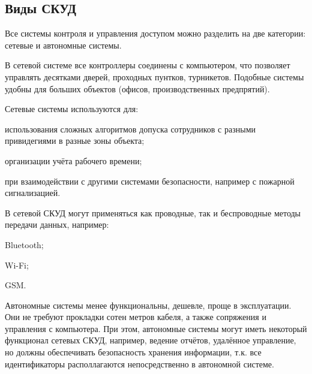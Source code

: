 \subsection{Виды СКУД}

Все системы контроля и управления доступом можно разделить на две категории: сетевые и автономные системы.

В сетевой системе все контроллеры соединены с компьютером, что позволяет управлять десятками дверей, проходных пунтков, турникетов. Подобные системы удобны для больших объектов (офисов, производственных предпрятий).

Сетевые системы используются для:

\begin{itemize*}
\item использования сложных алгоритмов допуска сотрудников с разными привидегиями в разные зоны объекта;
\item организации учёта рабочего времени;
\item при взаимодействии с другими системами безопасности, например с пожарной сигнализацией.
\end{itemize*}

В сетевой СКУД могут применяться как проводные, так и беспроводные методы передачи данных, например:

\begin{itemize*}
\item Bluetooth;
\item Wi-Fi;
\item GSM.
\end{itemize*}

Автономные системы менее функциональны, дешевле, проще в эксплуатации. Они не требуют прокладки сотен метров кабеля, а также сопряжения и управления с компьютера. При этом, автономные системы могут иметь некоторый функционал сетевых СКУД, например, ведение отчётов, удалённое управление, но должны обеспечивать безопасность хранения информации, т.к. все идентификаторы располлагаются непосредственно в автономной системе.
